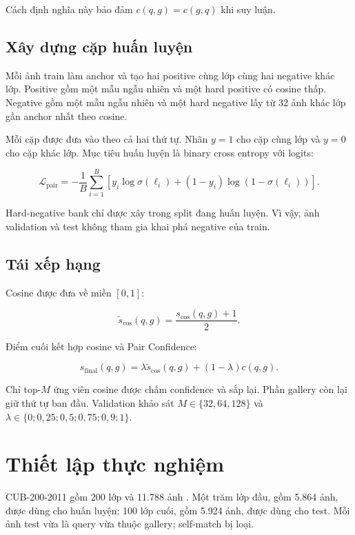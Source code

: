 \documentclass[11pt,a4paper]{article}
\begin{document}
Cách định nghĩa này bảo đảm $c(q,g)=c(g,q)$ khi suy luận.

\subsection{Xây dựng cặp huấn luyện}
Mỗi ảnh train làm anchor và tạo hai positive cùng lớp cùng hai negative khác lớp. Positive gồm một mẫu ngẫu nhiên và một hard positive có cosine thấp. Negative gồm một mẫu ngẫu nhiên và một hard negative lấy từ 32 ảnh khác lớp gần anchor nhất theo cosine.

Mỗi cặp được đưa vào theo cả hai thứ tự. Nhãn $y=1$ cho cặp cùng lớp và $y=0$ cho cặp khác lớp. Mục tiêu huấn luyện là binary cross entropy với logits:

\begin{equation}
\mathcal{L}_{\mathrm{pair}}
=-\frac{1}{B}\sum_{i=1}^{B}
\left[y_i\log\sigma(\ell_i)
+(1-y_i)\log(1-\sigma(\ell_i))\right].
\end{equation}

Hard-negative bank chỉ được xây trong split đang huấn luyện. Vì vậy, ảnh validation và test không tham gia khai phá negative của train.

\subsection{Tái xếp hạng}
Cosine được đưa về miền $[0,1]$:

\begin{equation}
\widetilde{s}_{\cos}(q,g)=\frac{s_{\cos}(q,g)+1}{2}.
\end{equation}

Điểm cuối kết hợp cosine và Pair Confidence:

\begin{equation}
s_{\mathrm{final}}(q,g)
=\lambda\widetilde{s}_{\cos}(q,g)
+(1-\lambda)c(q,g).
\end{equation}

Chỉ top-$M$ ứng viên cosine được chấm confidence và sắp lại. Phần gallery còn lại giữ thứ tự ban đầu. Validation khảo sát $M\in\{32,64,128\}$ và $\lambda\in\{0;0,25;0,5;0,75;0,9;1\}$.

\section{Thiết lập thực nghiệm}
CUB-200-2011 gồm 200 lớp và 11.788 ảnh \cite{wah2011cub}. Một trăm lớp đầu, gồm 5.864 ảnh, được dùng cho huấn luyện; 100 lớp cuối, gồm 5.924 ảnh, được dùng cho test. Mỗi ảnh test vừa là query vừa thuộc gallery; self-match bị loại.
\end{document}
